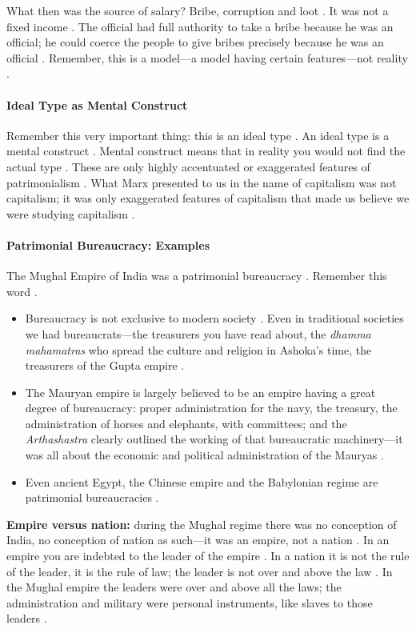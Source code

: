\begin{DataFact}
What then was the source of salary? Bribe, corruption and loot . It was not a fixed income .
The official had full authority to take a bribe because he was an official; he could coerce the people to give bribes precisely because he was an official .
Remember, this is a model---a model having certain features---not reality .
\end{DataFact}

\paragraph{Ideal Type as Mental Construct}
Remember this very important thing: this is an ideal type . An ideal type is a mental construct . Mental construct means that in reality you would not find the actual type . These are only highly accentuated or exaggerated features of patrimonialism .
What Marx presented to us in the name of capitalism was not capitalism; it was only exaggerated features of capitalism that made us believe we were studying capitalism .

\paragraph{Patrimonial Bureaucracy: Examples}
The Mughal Empire of India was a patrimonial bureaucracy . Remember this word .
\begin{itemize}
    \item Bureaucracy is not exclusive to modern society . Even in traditional societies we had bureaucrats---the treasurers you have read about, the \textit{dhamma mahamatras} who spread the culture and religion in Ashoka's time, the treasurers of the Gupta empire .
    \item The Mauryan empire is largely believed to be an empire having a great degree of bureaucracy: proper administration for the navy, the treasury, the administration of horses and elephants, with committees; and the \textit{Arthashastra} clearly outlined the working of that bureaucratic machinery---it was all about the economic and political administration of the Mauryas .
    \item Even ancient Egypt, the Chinese empire and the Babylonian regime are patrimonial bureaucracies .
\end{itemize}

\begin{ComparisonBox}
\textbf{Empire versus nation:} during the Mughal regime there was no conception of India, no conception of nation as such---it was an empire, not a nation .
In an empire you are indebted to the leader of the empire . In a nation it is not the rule of the leader, it is the rule of law; the leader is not over and above the law .
In the Mughal empire the leaders were over and above all the laws; the administration and military were personal instruments, like slaves to those leaders .
\end{ComparisonBox}

